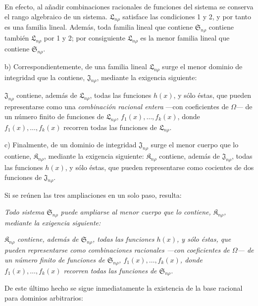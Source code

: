 \documentclass[11pt]{article}
\providecommand{\Kfield}{\mathfrak{K}}
\providecommand{\Ssys}{\mathfrak{S}}
\providecommand{\Lsys}{\mathfrak{L}}
\providecommand{\Jdom}{\mathfrak{J}}
\begin{document}
En efecto, al añadir combinaciones racionales de funciones del sistema se conserva el rango algebraico de un sistema. $\Lsys_{n\rho}$ satisface las condiciones 1 y 2, y por tanto es una familia lineal. Además, toda familia lineal que contiene $\Ssys_{n\rho}$ contiene también $\Lsys_{n\rho}$ por 1 y 2; por consiguiente $\Lsys_{n\rho}$ es la menor familia lineal que contiene $\Ssys_{n\rho}$.

b) Correspondientemente, de una familia lineal $\Lsys_{n\rho}$ surge el menor dominio de integridad que la contiene, $\Jdom_{n\rho}$, mediante la exigencia siguiente:

$\Jdom_{n\rho}$ contiene, además de $\Lsys_{n\rho}$, todas las funciones $h(x)$, y sólo éstas, que pueden representarse como una \emph{combinación racional entera} ---con coeficientes de $\Omega$--- de un número finito de funciones de $\Lsys_{n\rho}$, $f_1(x),\ldots,f_k(x)$, donde $f_1(x),\ldots,f_k(x)$ recorren todas las funciones de $\Lsys_{n\rho}$.

c) Finalmente, de un dominio de integridad $\Jdom_{n\rho}$ surge el menor cuerpo que lo contiene, $\Kfield_{n\rho}$, mediante la exigencia siguiente: $\Kfield_{n\rho}$ contiene, además de $\Jdom_{n\rho}$, todas las funciones $h(x)$, y sólo éstas, que pueden representarse como cocientes de dos funciones de $\Jdom_{n\rho}$.

Si se reúnen las tres ampliaciones en un solo paso, resulta:

\emph{Todo sistema $\Ssys_{n\rho}$ puede ampliarse al menor cuerpo que lo contiene, $\Kfield_{n\rho}$, mediante la exigencia siguiente:}

\emph{$\Kfield_{n\rho}$ contiene, además de $\Ssys_{n\rho}$, todas las funciones $h(x)$, y sólo éstas, que pueden representarse como combinaciones racionales ---con coeficientes de $\Omega$--- de un número finito de funciones de $\Ssys_{n\rho}$, $f_1(x),\ldots,f_k(x)$, donde $f_1(x),\ldots,f_k(x)$ recorren todas las funciones de $\Ssys_{n\rho}$.}

De este último hecho se sigue inmediatamente la existencia de la base racional para dominios arbitrarios:
\end{document}
